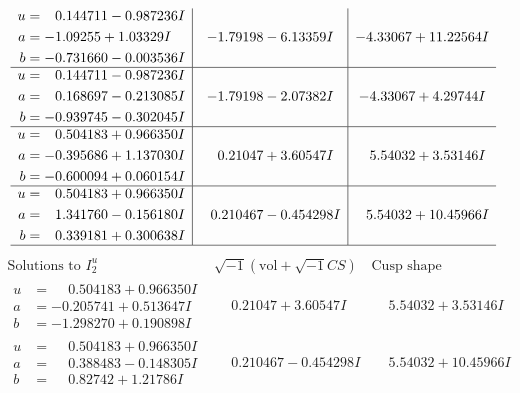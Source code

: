 \documentclass[1p]{elsarticle_modified}
\theoremstyle{definition}
\newcommand{\I}{\sqrt{-1}}
\begin{document}
$$\begin{array}{c|c|c}
\begin{aligned}
u &= \phantom{-}0.144711 - 0.987236 I \\
a &= -1.09255 + 1.03329 I \\
b &= -0.731660 - 0.003536 I\end{aligned}
 & -1.79198 - 6.13359 I & -4.33067 + 11.22564 I \\ \hline\begin{aligned}
u &= \phantom{-}0.144711 - 0.987236 I \\
a &= \phantom{-}0.168697 - 0.213085 I \\
b &= -0.939745 - 0.302045 I\end{aligned}
 & -1.79198 - 2.07382 I & -4.33067 + 4.29744 I \\ \hline\begin{aligned}
u &= \phantom{-}0.504183 + 0.966350 I \\
a &= -0.395686 + 1.137030 I \\
b &= -0.600094 + 0.060154 I\end{aligned}
 & \phantom{-}0.21047 + 3.60547 I & \phantom{-}5.54032 + 3.53146 I \\ \hline\begin{aligned}
u &= \phantom{-}0.504183 + 0.966350 I \\
a &= \phantom{-}1.341760 - 0.156180 I \\
b &= \phantom{-}0.339181 + 0.300638 I\end{aligned}
 & \phantom{-}0.210467 - 0.454298 I & \phantom{-}5.54032 + 10.45966 I\\
 \hline 
 \end{array}$$\newpage$$\begin{array}{c|c|c}  
\text{Solutions to }I^u_{2}& \I (\text{vol} + \sqrt{-1}CS) & \text{Cusp shape}\\
 \hline 
\begin{aligned}
u &= \phantom{-}0.504183 + 0.966350 I \\
a &= -0.205741 + 0.513647 I \\
b &= -1.298270 + 0.190898 I\end{aligned}
 & \phantom{-}0.21047 + 3.60547 I & \phantom{-}5.54032 + 3.53146 I \\ \hline\begin{aligned}
u &= \phantom{-}0.504183 + 0.966350 I \\
a &= \phantom{-}0.388483 - 0.148305 I \\
b &= \phantom{-}0.82742 + 1.21786 I\end{aligned}
 & \phantom{-}0.210467 - 0.454298 I & \phantom{-}5.54032 + 10.45966 I \\ \hline\begin{aligned}

\end{aligned}
\end{array}$$
\end{document}
